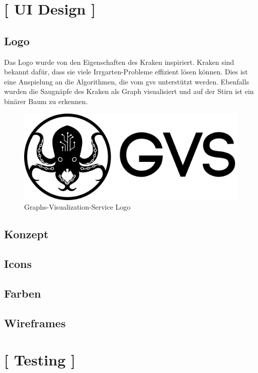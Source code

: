 \documentclass[11pt,a4paper,english,oneside]{book}
\numberwithin{equation}{chapter}
\begin{document}
	\section{ [ UI Design ] }
	
	\subsection{Logo}
	Das Logo wurde von den Eigenschaften des Kraken \cite{kraken} inspiriert. Kraken sind bekannt dafür, dass sie viele Irrgarten-Probleme effizient lösen können. Dies ist eine Anspielung an die Algorithmen, die vom \gls{gvs} unterstützt werden. Ebenfalls wurden die Saugnäpfe des Kraken als Graph visualisiert und auf der Stirn ist ein binärer Baum zu erkennen. 
	
	\begin{figure}[h!]
		\centering
		\includegraphics[width=0.7\linewidth]{assets/images/logo}
		\caption[GVS Logo]{Graphs-Visualization-Service Logo}
		\label{fig:logo}
	\end{figure}
	
	
	
	
	
	\subsection{Konzept}
	
	\subsection{Icons}
	
	\subsection{Farben}
	
	\subsection{Wireframes}
	
	\section{ [ Testing ] }
	
\end{document}
